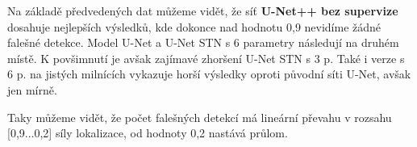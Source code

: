 Na základě předvedených dat můžeme vidět, že síť \textbf{U-Net++ bez supervize} dosahuje nejlepších výsledků, kde dokonce nad hodnotu 0,9 nevidíme žádné falešné detekce. Model U-Net a U-Net STN s 6 parametry následují na druhém místě.  K povšimnutí je avšak zajímavé zhoršení  U-Net STN s 3 p. Také i verze s 6 p. na jistých milnících vykazuje horší výsledky oproti původní síti U-Net, avšak jen mírně.

Taky můžeme vidět, že počet falešných detekcí má lineární převahu v rozsahu [0,9...0,2] síly lokalizace, od hodnoty 0,2 nastává průlom.
\endinput
